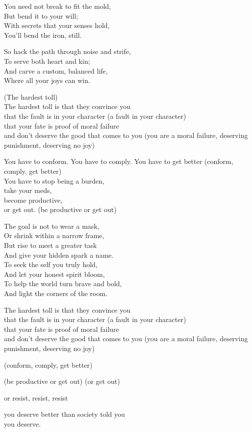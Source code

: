 \begin{lyrics}
You need not break to fit the mold,\\
But bend it to your will;\\
With secrets that your senses hold,\\
You'll bend the iron, still.

So hack the path through noise and strife,\\
To serve both heart and kin;\\
And carve a custom, balanced life,\\
Where all your joys can win.

(The hardest toll)\\
The hardest toll is that they convince you\\
that the fault is in your character
(a fault in your character)\\
that your fate is proof of moral failure\\
and don't deserve the good that comes to you
(you are a moral failure, deserving punishment, deserving no joy)

You have to conform. You have to comply. You have to get better
(conform, comply, get better)\\
You have to stop being a burden,\\
take your meds,\\
become productive,\\
or get out.
(be productive or get out)

The goal is not to wear a mask,\\
Or shrink within a narrow frame,\\
But rise to meet a greater task\\
And give your hidden spark a name.\\
To seek the self you truly hold,\\
And let your honest spirit bloom,\\
To help the world turn brave and bold,\\
And light the corners of the room.

The hardest toll is that they convince you\\
that the fault is in your character
(a fault in your character)\\
that your fate is proof of moral failure\\
and don't deserve the good that comes to you
(you are a moral failure, deserving punishment, deserving no joy)

(conform, comply, get better)

(be productive or get out)
(or get out)

or resist, resist, resist

you deserve better than society told you\\
you deserve.
\end{lyrics}

